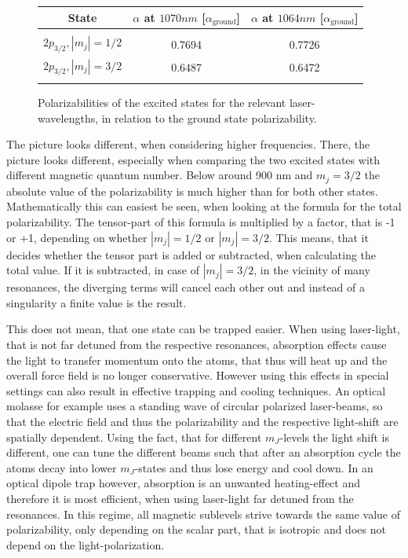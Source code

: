 \begin{figure}[h]
\begin{center}
\begin{tabular}{ccc}
State&$\alpha$ at $1070\unit{nm}$ [$\alpha_{\mathrm{ground}}$]&$\alpha$ at $1064\unit{nm}$ [$\alpha_{\mathrm{ground}}$]\\\hline\hline\\
$2p_{3/2}, |m_j|=1/2$&0.7694&0.7726\\
$2p_{3/2}, |m_j|=3/2$&0.6487&0.6472\\
\\\hline
\end{tabular}
\end{center}
\caption{Polarizabilities of the excited states for the relevant laser-wavelengths, in relation to the ground state polarizability.}
\label{relativealpha}
\end{figure}

The picture looks different, when considering higher frequencies. There, the picture looks different, especially when comparing the two excited states with different magnetic quantum number. Below around 900 nm and $m_j=3/2$ the absolute value of the polarizability is much higher than for both other states. Mathematically this can easiest be seen, when looking at the formula for the total polarizability. The tensor-part of this formula is multiplied by a factor, that is -1 or +1, depending on whether $|m_j|=1/2$ or $|m_j|=3/2$. This means, that it decides whether the tensor part is added or subtracted, when calculating the total value. If it is subtracted, in case of $|m_j|=3/2$, in the vicinity of many resonances, the diverging terms will cancel each other out and instead of a singularity a finite value is the result.

This does not mean, that one state can be trapped easier. When using laser-light, that is not far detuned from the respective resonances, absorption effects cause the light to transfer momentum onto the atoms, that thus will heat up and the overall force field is no longer conservative. However using this effects in special settings can also result in effective trapping and cooling techniques. An optical molasse for example uses a standing wave of circular polarized laser-beams, so that the electric field and thus the polarizability and the respective light-shift are spatially dependent. Using the fact, that for different $m_J$-levels the light shift is different, one can tune the different beams such that after an absorption cycle the atoms decay into lower $m_J$-states and thus lose energy and cool down. In an optical dipole trap however, absorption is an unwanted heating-effect and therefore it is most efficient, when using laser-light far detuned from the resonances. In this regime, all magnetic sublevels strive towards the same value of polarizability, only depending on the scalar part, that is isotropic and does not depend on the light-polarization.

